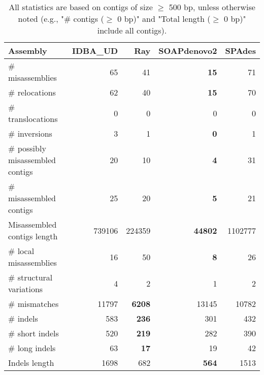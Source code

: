 \documentclass[12pt,a4paper]{article}
\begin{document}
\begin{table}[ht]
\begin{center}
\caption{All statistics are based on contigs of size $\geq$ 500 bp, unless otherwise noted (e.g., "\# contigs ($\geq$ 0 bp)" and "Total length ($\geq$ 0 bp)" include all contigs).}
\begin{tabular}{|l*{4}{|r}|}
\hline
Assembly & IDBA\_UD & Ray & SOAPdenovo2 & SPAdes \\ \hline
\# misassemblies & 65 & 41 & {\bf 15} & 71 \\ \hline
\hspace{5mm}\# relocations & 62 & 40 & {\bf 15} & 70 \\ \hline
\hspace{5mm}\# translocations & 0 & 0 & 0 & 0 \\ \hline
\hspace{5mm}\# inversions & 3 & 1 & {\bf 0} & 1 \\ \hline
\# possibly misassembled contigs & 20 & 10 & {\bf 4} & 31 \\ \hline
\# misassembled contigs & 25 & 20 & {\bf 5} & 21 \\ \hline
Misassembled contigs length & 739106 & 224359 & {\bf 44802} & 1102777 \\ \hline
\# local misassemblies & 16 & 50 & {\bf 8} & 26 \\ \hline
\# structural variations & 4 & 2 & 1 & 2 \\ \hline
\# mismatches & 11797 & {\bf 6208} & 13145 & 10782 \\ \hline
\# indels & 583 & {\bf 236} & 301 & 432 \\ \hline
\hspace{5mm}\# short indels & 520 & {\bf 219} & 282 & 390 \\ \hline
\hspace{5mm}\# long indels & 63 & {\bf 17} & 19 & 42 \\ \hline
Indels length & 1698 & 682 & {\bf 564} & 1513 \\ \hline
\end{tabular}
\end{center}
\end{table}
\end{document}
